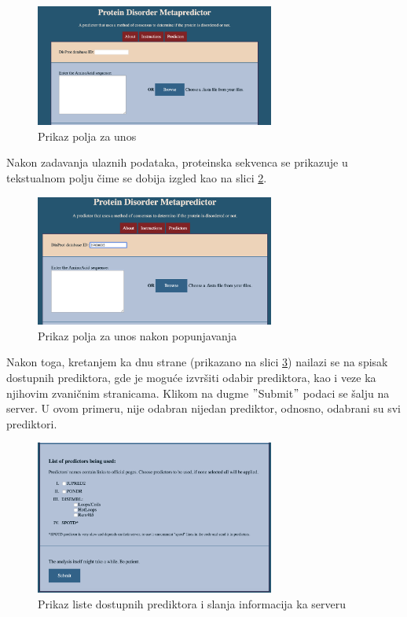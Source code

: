 \begin{figure}[H]
	\centering
    \includegraphics[width=0.7\textwidth]{Figures/App/first_screen.png}
    \caption{Prikaz polja za unos}
    \label{fig:poljaunos}
\end{figure}
Nakon zadavanja ulaznih podataka, proteinska sekvenca se prikazuje u tekstualnom polju čime se dobija izgled kao na slici \ref{fig:unos}.
\begin{figure}[H]
	\centering
    \includegraphics[width=0.7\textwidth]{Figures/App/second_screen.png}
    \caption{Prikaz polja za unos nakon popunjavanja}
    \label{fig:unos}
\end{figure}
Nakon toga, kretanjem ka dnu strane (prikazano na slici \ref{fig:browse}) nailazi se na spisak dostupnih prediktora, gde je moguće izvršiti odabir prediktora, kao i veze ka njihovim zvaničnim stranicama. Klikom na dugme $"$Submit$"$ podaci se šalju na server. U ovom primeru, nije odabran nijedan prediktor, odnosno, odabrani su svi prediktori. 
\begin{figure}[H]
	\centering
    \includegraphics[width=0.7\textwidth]{Figures/App/third_screen.png}
    \caption{Prikaz liste dostupnih prediktora i slanja informacija ka serveru}
    \label{fig:browse}
\end{figure}
